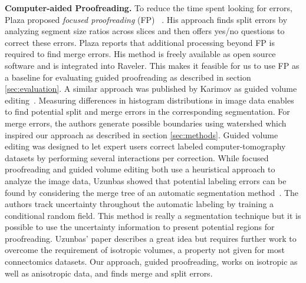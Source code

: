 \textbf{Computer-aided Proofreading.} To reduce the time spent looking for errors, Plaza proposed \textit{focused proofreading} (FP) ~\cite{focused_proofreading}. His approach finds split errors by analyzing segment size ratios across slices and then offers yes/no questions to correct these errors. Plaza reports that additional processing beyond FP is required to find merge errors. His method is freely available as open source software and is integrated into Raveler. This makes it feasible for us to use FP as a baseline for evaluating guided proofreading as described in section \ref{sec:evaluation}. A similar approach was published by Karimov \etal as guided volume editing~\cite{karimov_guided_volume_editing}. Measuring differences in histogram distributions in image data enables to find potential split and merge errors in the corresponding segmentation. For merge errors, the authors generate possible boundaries using watershed which inspired our approach as described in section \ref{sec:methods}. Guided volume editing was designed to let expert users correct labeled computer-tomography datasets by performing several interactions per correction. While focused proofreading and guided volume editing both use a heuristical approach to analyze the image data, Uzunbas \etal showed that potential labeling errors can be found by considering the merge tree of an automatic segmentation method~\cite{uzunbas}. The authors track uncertainty throughout the automatic labeling by training a conditional random field. This method is really a segmentation technique but it is possible to use the uncertainty information to present potential regions for proofreading. Uzunbas' paper describes a great idea but requires further work to overcome the requirement of isotropic volumes, a property not given for most connectomics datasets. Our approach, guided proofreading, works on isotropic as well as anisotropic data, and finds merge and split errors.